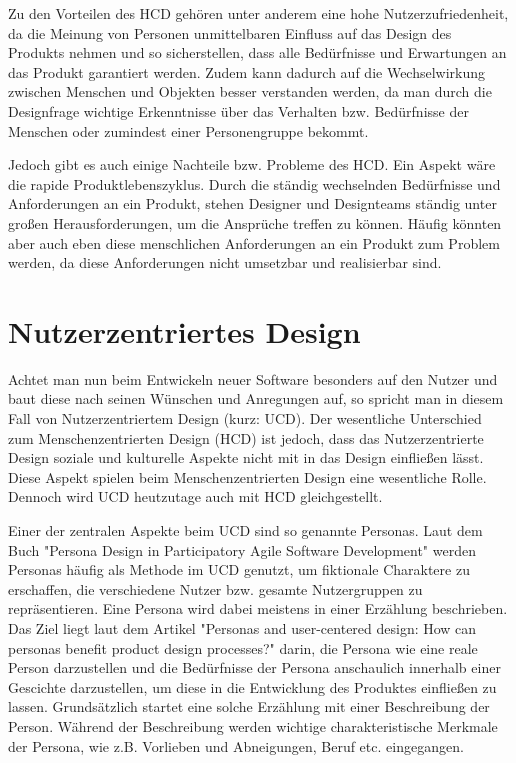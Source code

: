 Zu den Vorteilen des HCD gehören unter anderem eine hohe Nutzerzufriedenheit, da die Meinung von Personen unmittelbaren Einfluss auf das Design des Produkts nehmen und so sicherstellen, dass alle Bedürfnisse und Erwartungen an das Produkt garantiert werden. Zudem kann dadurch auf die Wechselwirkung zwischen Menschen und Objekten besser verstanden werden, da man durch die Designfrage wichtige Erkenntnisse über das Verhalten bzw. Bedürfnisse der Menschen oder zumindest einer Personengruppe bekommt.

Jedoch gibt es auch einige Nachteile bzw. Probleme des HCD. Ein Aspekt wäre die rapide Produktlebenszyklus. Durch die ständig wechselnden Bedürfnisse und Anforderungen an ein Produkt, stehen Designer und Designteams ständig unter großen Herausforderungen, um die Ansprüche treffen zu können. Häufig könnten aber auch eben diese menschlichen Anforderungen an ein Produkt zum Problem werden, da diese Anforderungen nicht umsetzbar und realisierbar sind.




\section{Nutzerzentriertes Design}
Achtet man nun beim Entwickeln neuer Software besonders auf den Nutzer und baut diese nach seinen Wünschen und Anregungen auf, so spricht man in diesem Fall von Nutzerzentriertem Design (kurz: UCD). Der wesentliche Unterschied zum Menschenzentrierten Design (HCD) ist jedoch, dass das Nutzerzentrierte Design soziale und kulturelle Aspekte nicht mit in das Design einfließen lässt. Diese Aspekt spielen beim Menschenzentrierten Design eine wesentliche Rolle. Dennoch wird UCD heutzutage auch mit HCD gleichgestellt.

Einer der zentralen Aspekte beim UCD sind so genannte Personas. Laut dem Buch "Persona Design in Participatory Agile Software Development" werden Personas häufig als Methode im UCD genutzt, um fiktionale Charaktere zu erschaffen, die verschiedene Nutzer bzw. gesamte Nutzergruppen zu repräsentieren. Eine Persona wird dabei meistens in einer Erzählung beschrieben. Das Ziel liegt laut dem Artikel "Personas and user-centered design: How can personas benefit product design processes?" darin, die Persona wie eine reale Person darzustellen und die Bedürfnisse der Persona anschaulich innerhalb einer Gescichte darzustellen, um diese in die Entwicklung des Produktes einfließen zu lassen.
Grundsätzlich startet eine solche Erzählung mit einer Beschreibung der Person. Während der Beschreibung werden wichtige charakteristische Merkmale der Persona, wie z.B. Vorlieben und Abneigungen, Beruf etc. eingegangen.



